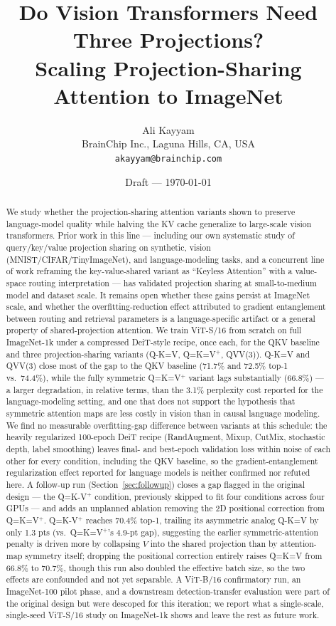 \documentclass[11pt]{article}
\title{Do Vision Transformers Need Three Projections?\\
Scaling Projection-Sharing Attention to ImageNet}
\author{
Ali Kayyam \\
BrainChip Inc., Laguna Hills, CA, USA \\
\texttt{akayyam@brainchip.com}
}
\date{Draft --- \today}
\begin{document}
\maketitle

\begin{abstract}
We study whether the projection-sharing attention variants shown to preserve
language-model quality while halving the KV cache
\citep{kayyam2026three} generalize to large-scale vision transformers.
Prior work in this line --- including our own systematic study of
query/key/value projection sharing on synthetic, vision (MNIST/CIFAR/TinyImageNet),
and language-modeling tasks, and a concurrent line of work reframing the
key-value-shared variant as ``Keyless Attention'' with a value-space routing
interpretation \citep{gao2026keyless} --- has validated projection sharing
at small-to-medium model and dataset scale. It remains open whether these gains persist at ImageNet scale, and whether
the overfitting-reduction effect attributed to gradient entanglement between
routing and retrieval parameters \citep{gao2026keyless} is a language-specific
artifact or a general property of shared-projection attention. We train
ViT-S/16 from scratch on full ImageNet-1k under a compressed DeiT-style
recipe, once each, for the QKV baseline and three projection-sharing
variants (Q-K=V, Q=K=V\(^+\), QVV(3)). Q-K=V and QVV(3) close most of the gap
to the QKV baseline (71.7\% and 72.5\% top-1 vs.\ 74.4\%), while the fully
symmetric Q=K=V\(^+\) variant lags substantially (66.8\%) --- a larger
degradation, in relative terms, than the 3.1\% perplexity cost reported for
the language-modeling setting, and one that does not support the hypothesis
that symmetric attention maps are less costly in vision than in causal
language modeling. We find no measurable overfitting-gap difference between
variants at this schedule: the heavily regularized 100-epoch DeiT recipe
(RandAugment, Mixup, CutMix, stochastic depth, label smoothing) leaves final-
and best-epoch validation loss within noise of each other for every
condition, including the QKV baseline, so the gradient-entanglement
regularization effect reported for language models is neither confirmed nor
refuted here. A follow-up run (Section~\ref{sec:followup}) closes a gap
flagged in the original design --- the Q=K-V\(^+\) condition, previously
skipped to fit four conditions across four GPUs --- and adds an unplanned
ablation removing the 2D positional correction from Q=K=V\(^+\). Q=K-V\(^+\)
reaches 70.4\% top-1, trailing its asymmetric analog Q-K=V by only 1.3 pts
(vs.\ Q=K=V\(^+\)'s 4.9-pt gap), suggesting the earlier symmetric-attention
penalty is driven more by collapsing \(V\) into the shared projection than
by attention-map symmetry itself; dropping the positional correction
entirely raises Q=K=V from 66.8\% to 70.7\%, though this run also doubled
the effective batch size, so the two effects are confounded and not yet
separable. A ViT-B/16 confirmatory run, an ImageNet-100 pilot phase, and a
downstream detection-transfer evaluation were part of the original design but
were descoped for this iteration; we report what a single-scale, single-seed
ViT-S/16 study on ImageNet-1k shows and leave the rest as future work.
\end{abstract}
\end{document}
